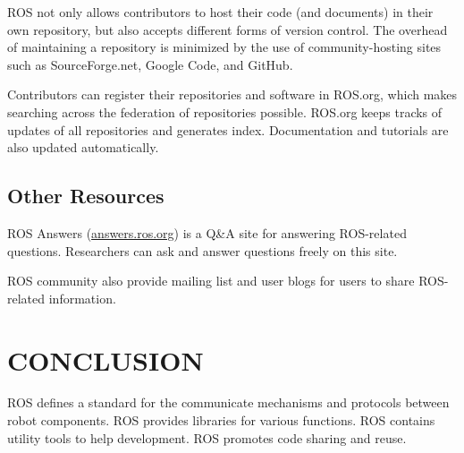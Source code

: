 \documentclass[a4paper, 10pt, conference]{ieeeconf}       %
\begin{document}
ROS not only allows contributors to host their code (and documents) in their own repository, but also accepts different forms of version control. The overhead of maintaining a repository is minimized by the use of community-hosting sites such as SourceForge.net, Google
Code, and GitHub.

Contributors can register their repositories and software in ROS.org, which makes searching across the federation of repositories possible. ROS.org keeps tracks of updates of all repositories and generates index. Documentation and tutorials are also updated automatically.


\subsection{Other Resources}
ROS Answers (\url{answers.ros.org}) is a Q\&A site for answering ROS-related questions. Researchers can ask and answer questions freely on this site.

ROS community also provide mailing list and user blogs for users to share ROS-related information.

\section{CONCLUSION}

   ROS defines a standard for the communicate mechanisms and protocols between robot components.
   ROS provides libraries for various functions.
   ROS contains utility tools to help development.
   ROS promotes code sharing and reuse.



  
\end{document}
